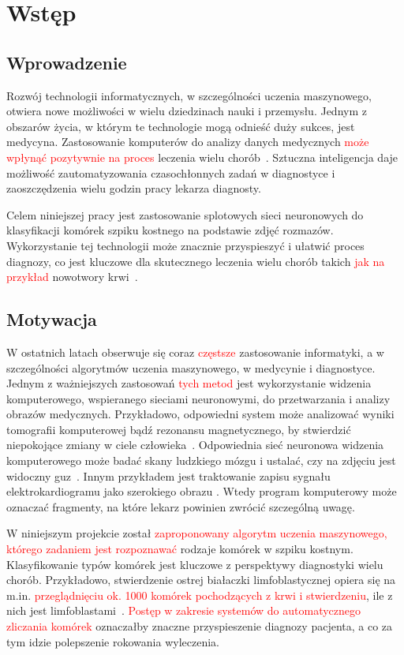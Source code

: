 \chapter{Wstęp}


\section{Wprowadzenie}

Rozwój technologii informatycznych, w szczególności uczenia maszynowego, otwiera nowe możliwości w wielu dziedzinach nauki i przemysłu.
Jednym z obszarów życia, w którym te technologie mogą odnieść duży sukces, jest medycyna.
Zastosowanie komputerów do analizy danych medycznych \textcolor{red}{może wpłynąć pozytywnie na proces} leczenia wielu chorób~\cite{machine_learning_in_medicine}.
Sztuczna inteligencja daje możliwość zautomatyzowania czasochłonnych zadań w diagnostyce i zaoszczędzenia wielu godzin pracy lekarza diagnosty.

Celem niniejszej pracy jest zastosowanie splotowych sieci neuronowych do klasyfikacji komórek szpiku kostnego na podstawie zdjęć rozmazów.
Wykorzystanie tej technologii może znacznie przyspieszyć i ułatwić proces diagnozy, co jest kluczowe dla skutecznego leczenia wielu chorób takich \textcolor{red}{jak na przykład} nowotwory krwi~\cite{machine_learning_cancer}.


\section{Motywacja}

W ostatnich latach obserwuje się coraz \textcolor{red}{częstsze} zastosowanie informatyki, a w szczególności algorytmów uczenia maszynowego,
w medycynie i diagnostyce.
Jednym z ważniejszych zastosowań \textcolor{red}{tych metod} jest wykorzystanie widzenia komputerowego, wspieranego sieciami neuronowymi, do przetwarzania i analizy obrazów medycznych.
Przykładowo, odpowiedni system może analizować wyniki tomografii komputerowej bądź rezonansu magnetycznego, by stwierdzić niepokojące zmiany w ciele człowieka~\cite{mri}.
Odpowiednia sieć neuronowa widzenia komputerowego może badać skany ludzkiego mózgu i ustalać, czy na zdjęciu jest widoczny guz~\cite{brain_tumor}.
Innym przykładem jest traktowanie zapisu sygnału elektrokardiogramu jako szerokiego
obrazu \cite{ecg_cnn}.
Wtedy program komputerowy może oznaczać fragmenty, na które lekarz powinien zwrócić szczególną uwagę.

W niniejszym projekcie został \textcolor{red}{zaproponowany algorytm uczenia maszynowego, którego zadaniem jest rozpoznawać} rodzaje komórek w szpiku kostnym.
Klasyfikowanie typów komórek jest kluczowe z perspektywy diagnostyki wielu chorób.
Przykładowo, stwierdzenie ostrej białaczki limfoblastycznej opiera się na m.in.
\textcolor{red}{przeglądnięciu ok. 1000 komórek pochodzących z krwi i stwierdzeniu}, ile z nich jest limfoblastami~\cite{blast_counting_diagnosis}.
\textcolor{red}{Postęp w zakresie systemów do automatycznego zliczania komórek} oznaczałby znaczne przyspieszenie diagnozy pacjenta, a co za tym idzie polepszenie rokowania wyleczenia.

